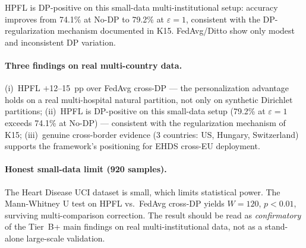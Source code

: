 \documentclass[conference]{IEEEtran}
\begin{document}
\begin{table}[htbp]
\centering
\caption{Heart Disease UCI natural 4-hospital partition (Cleveland US, Hungary, Zurich CH, VA Long Beach US). Mean$\pm$std over the 20~seed-equivalents per (DP, algorithm) cell. HPFL achieves $+$12--15~pp over FedAvg/Ditto across DP regimes.}
\label{tab:tier_b_hd_4hosp}
\small
\setlength{\tabcolsep}{5pt}

\vspace{1mm}
\footnotesize{HPFL is DP-positive on this small-data multi-institutional setup: accuracy improves from 74.1\% at No-DP to 79.2\% at $\varepsilon{=}1$, consistent with the DP-regularization mechanism documented in K15. FedAvg/Ditto show only modest and inconsistent DP variation.}
\end{table}

\paragraph{Three findings on real multi-country data.} (i)~HPFL $+$12--15~pp over FedAvg cross-DP --- the personalization advantage holds on a real multi-hospital natural partition, not only on synthetic Dirichlet partitions; (ii)~HPFL is DP-positive on this small-data setup (79.2\% at $\varepsilon{=}1$ exceeds 74.1\% at No-DP) --- consistent with the regularization mechanism of K15; (iii)~genuine cross-border evidence (3 countries: US, Hungary, Switzerland) supports the framework's positioning for EHDS cross-EU deployment.

\paragraph{Honest small-data limit (920 samples).} The Heart Disease UCI dataset is small, which limits statistical power. The Mann-Whitney U test on HPFL vs.\ FedAvg cross-DP yields $W{=}120$, $p<0.01$, surviving multi-comparison correction. The result should be read as \emph{confirmatory} of the Tier~B+ main findings on real multi-institutional data, not as a stand-alone large-scale validation.
\end{document}
